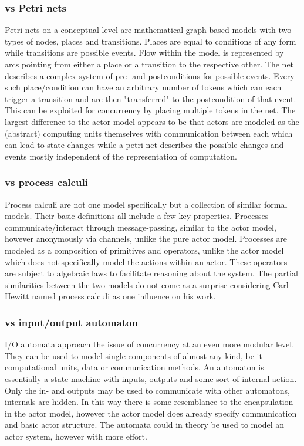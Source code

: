 \documentclass[A4]{article}
\begin{document}
\subsubsection{vs Petri nets}
Petri nets on a conceptual level are mathematical graph-based models with two types of nodes, places and transitions. Places are equal to conditions of any form while transitions are possible events. Flow within the model is represented by arcs pointing from either a place or a transition to the respective other. The net describes a complex system of pre- and postconditions for possible events. Every such place/condition can have an arbitrary number of tokens which can each trigger a transition and are then "transferred" to the postcondition of that event. \cite{Petri2}\cite{murata1989petri}
This can be exploited for concurrency by placing multiple tokens in the net. 
The largest difference to the actor model appears to be that actors are modeled as the (abstract) computing units themselves with communication between each which can lead to state changes while a petri net describes the possible changes and events mostly independent of the representation of computation.
\subsubsection{vs process calculi}
Process calculi are not one model specifically but a collection of similar formal models. Their basic definitions all include a few key properties. Processes communicate/interact through message-passing, similar to the actor model, however anonymously via channels, unlike the pure actor model. Processes are modeled as a composition of primitives and operators, unlike the actor model which does not specifically model the actions within an actor. These operators are subject to algebraic laws to facilitate reasoning about the system. \cite{Baeten:2005:BHP:1085667.1085669} The partial similarities between the two models do not come as a surprise considering Carl Hewitt named process calculi as one influence on his work. 
\subsubsection{vs input/output automaton}
I/O automata approach the issue of concurrency at an even more modular level. They can be used to model single components of almost any kind, be it computational units, data or communication methods. An automaton is essentially a state machine with inputs, outputs and some sort of internal action. Only the in- and outputs may be used to communicate with other automatons, internals are hidden. \cite{lynch1996distributed}
In this way there is some resemblance to the encapsulation in the actor model, however the actor model does already specify communication and basic actor structure. The automata could in theory be used to model an actor system, however with more effort.
\end{document}
